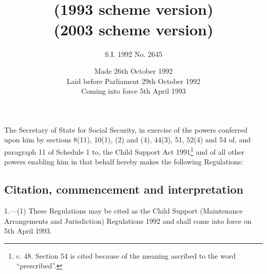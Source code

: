 \documentclass[12pt,a4paper]{article}
\title{\regstitle\\(1993 scheme version)}
\title{\regstitle\\(2003 scheme version)}
\author{S.I. 1992 No. 2645}
\date{Made 26th October 1992\\Laid before Parliament 29th October 1992\\Coming into force 5th April 1993}
\begin{document}
\maketitle

\noindent
The Secretary of State for Social Security, in exercise of the powers conferred upon him by sections 8(11), 10(1), (2) and (4), 44(3), 51, 52(4) and 54 of, and paragraph 11 of Schedule 1 to, the Child Support Act 1991\footnote{ c. 48. Section 54 is cited because of the meaning ascribed to the word “prescribed”.} and of all other powers enabling him in that behalf hereby makes the following Regulations:


{\sloppy

\tableofcontents

}

\setcounter{secnumdepth}{-2}

\subsection[1. Citation, commencement and interpretation]{Citation, commencement and interpretation}

1.—(1) These Regulations may be cited as the Child Support (Maintenance Arrangements and Jurisdiction) Regulations 1992 and shall come into force on 5th April 1993.
\end{document}
